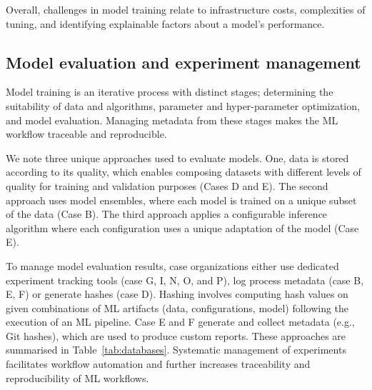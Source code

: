 Overall, challenges in model training relate to infrastructure costs, complexities of tuning, and identifying explainable factors about a model's performance.



\subsection{Model evaluation and experiment management}
Model training is an iterative process with distinct stages; determining the suitability of data and algorithms, parameter and hyper-parameter optimization, and model evaluation. Managing metadata from these stages makes the ML workflow traceable and reproducible.

We note three unique approaches used to evaluate models. One, data is stored according to its quality, which enables composing datasets with different levels of quality for training and validation purposes (Cases D and E). The second approach uses model ensembles, where each model is trained on a unique subset of the data (Case B). The third approach applies a configurable inference algorithm where each configuration uses a unique adaptation of the model (Case E). 

To manage model evaluation results, case organizations either use dedicated experiment tracking tools (case G, I, N, O, and P), log process metadata (case B, E, F) or generate hashes (case D). Hashing involves computing hash values on given combinations of ML artifacts (data, configurations, model) following the execution of an ML pipeline. Case E and F generate and collect metadata (e.g., Git hashes), which are used to produce custom reports. These approaches are summarised in Table~\ref{tab:databases}. 
Systematic management of experiments facilitates workflow automation and further increases traceability and reproducibility of ML workflows.

